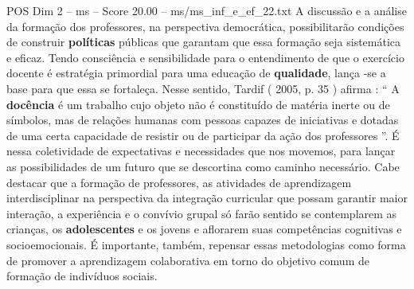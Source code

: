 \begin{textsample}{POS Dim 2 – ms – Score 20.00 – ms/ms\_inf\_e\_ef\_22.txt}
A discussão e a análise da formação dos professores, na perspectiva democrática, possibilitarão condições de construir \textbf{políticas} públicas que garantam que essa formação seja sistemática e eficaz.
Tendo consciência e sensibilidade para o entendimento de que o exercício docente é estratégia primordial para uma educação de \textbf{qualidade}, lança -se a base para que essa se fortaleça.
Nesse sentido, Tardif ( 2005, p. 35 ) afirma : “ A \textbf{docência} é um trabalho cujo objeto não é constituído de matéria inerte ou de símbolos, mas de relações humanas com pessoas capazes de iniciativas e dotadas de uma certa capacidade de resistir ou de participar da ação dos professores ”.
É nessa coletividade de expectativas e necessidades que nos movemos, para lançar as possibilidades de um futuro que se descortina como caminho necessário.
Cabe destacar que a formação de professores, as atividades de aprendizagem interdisciplinar na perspectiva da integração curricular que possam garantir maior interação, a experiência e o convívio grupal só farão sentido se contemplarem as crianças, os \textbf{adolescentes} e os jovens e aflorarem suas competências cognitivas e socioemocionais.
É importante, também, repensar essas metodologias como forma de promover a aprendizagem colaborativa em torno do objetivo comum de formação de indivíduos sociais.

\end{textsample}
